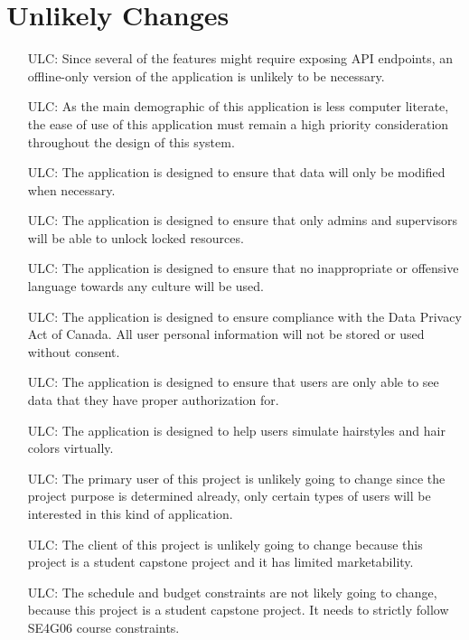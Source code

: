 \documentclass[12pt]{article}
\newcounter{lcnum} %
\newcounter{ulcnum} %
\begin{document}
\section{Unlikely Changes}    

\noindent \begin{itemize}

\item[ULC\refstepcounter{ulcnum}\theulcnum\label{ULC_meaningfulLabel}:] 
Since several of the features might require exposing API endpoints, an offline-only version of the application is unlikely to be necessary. 
\item[ULC\refstepcounter{ulcnum}\theulcnum\label{ULC_meaningfulLabel}:] 
As the main demographic of this application is less computer literate, the ease of use of this application must remain a high priority consideration throughout the design of this system.
\item[ULC\refstepcounter{ulcnum}\theulcnum\label{ULC_meaningfulLabel}:] 
The application is designed to ensure that data will only be modified when necessary. 
\item[ULC\refstepcounter{ulcnum}\theulcnum\label{ULC_meaningfulLabel}:] 
The application is designed to ensure that only admins and supervisors will be able to unlock locked resources.
\item[ULC\refstepcounter{ulcnum}\theulcnum\label{ULC_meaningfulLabel}:] 
The application is designed to ensure that no inappropriate or offensive language towards any culture will be used.
\item[ULC\refstepcounter{ulcnum}\theulcnum\label{ULC_meaningfulLabel}:] 
The application is designed to ensure compliance with the Data Privacy Act of Canada. All user personal information will not be stored or used without consent. 
\item[ULC\refstepcounter{ulcnum}\theulcnum\label{ULC_meaningfulLabel}:] 
The application is designed to ensure that users are only able to see data that they have proper authorization for.
\item[ULC\refstepcounter{ulcnum}\theulcnum\label{ULC_meaningfulLabel}:] 
The application is designed to help users simulate hairstyles and hair colors virtually.
\item[ULC\refstepcounter{ulcnum}\theulcnum\label{ULC_meaningfulLabel}:] 
The primary user of this project is unlikely going to change since the project purpose is determined already, only certain types of users will be interested in this kind of application.
\item[ULC\refstepcounter{ulcnum}\theulcnum\label{ULC_meaningfulLabel}:] 
The client of this project is unlikely going to change because this project is a student capstone project and it has limited marketability.
\item[ULC\refstepcounter{ulcnum}\theulcnum\label{ULC_meaningfulLabel}:] 
The schedule and budget constraints are not likely going to change, because this project is a student capstone project. It needs to strictly follow SE4G06 course constraints.








\end{itemize}
\end{document}
